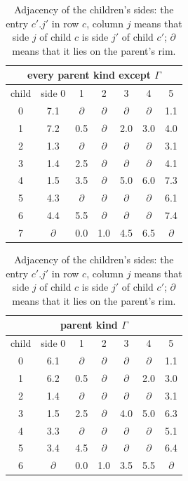 \documentclass[11pt]{amsart}
\theoremstyle{definition}
\theoremstyle{remark}
\newcommand{\rim}{\partial}
\begin{document}
\begin{table}[t]
\centering\small
\setlength{\tabcolsep}{3.6pt}
\caption{Adjacency of the children's sides: the entry $c'.j'$ in row $c$, column $j$ means that side $j$ of child $c$
is side $j'$ of child $c'$; $\rim$ means that it lies on the parent's rim.}
\label{tab:sides}
\begin{tabular}[t]{c@{\hspace{1.2em}}cccccc}
\toprule
\multicolumn{7}{c}{every parent kind except $\Gamma$}\\
\midrule
child & side 0 & 1 & 2 & 3 & 4 & 5\\
\midrule
0 & 7.1 & $\rim$ & $\rim$ & $\rim$ & $\rim$ & 1.1\\
1 & 7.2 & 0.5 & $\rim$ & 2.0 & 3.0 & 4.0\\
2 & 1.3 & $\rim$ & $\rim$ & $\rim$ & $\rim$ & 3.1\\
3 & 1.4 & 2.5 & $\rim$ & $\rim$ & $\rim$ & 4.1\\
4 & 1.5 & 3.5 & $\rim$ & 5.0 & 6.0 & 7.3\\
5 & 4.3 & $\rim$ & $\rim$ & $\rim$ & $\rim$ & 6.1\\
6 & 4.4 & 5.5 & $\rim$ & $\rim$ & $\rim$ & 7.4\\
7 & $\rim$ & 0.0 & 1.0 & 4.5 & 6.5 & $\rim$\\
\bottomrule
\end{tabular}\qquad
\begin{tabular}[t]{c@{\hspace{1.2em}}cccccc}
\toprule
\multicolumn{7}{c}{parent kind $\Gamma$}\\
\midrule
child & side 0 & 1 & 2 & 3 & 4 & 5\\
\midrule
0 & 6.1 & $\rim$ & $\rim$ & $\rim$ & $\rim$ & 1.1\\
1 & 6.2 & 0.5 & $\rim$ & $\rim$ & 2.0 & 3.0\\
2 & 1.4 & $\rim$ & $\rim$ & $\rim$ & $\rim$ & 3.1\\
3 & 1.5 & 2.5 & $\rim$ & 4.0 & 5.0 & 6.3\\
4 & 3.3 & $\rim$ & $\rim$ & $\rim$ & $\rim$ & 5.1\\
5 & 3.4 & 4.5 & $\rim$ & $\rim$ & $\rim$ & 6.4\\
6 & $\rim$ & 0.0 & 1.0 & 3.5 & 5.5 & $\rim$\\
\bottomrule
\end{tabular}
\end{table}
\end{document}
